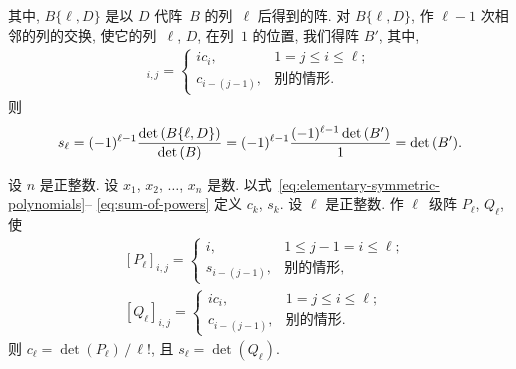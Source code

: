 \documentclass[../libro.tex]{subfiles}
\begin{document}
\begin{example}
    其中, \(B\{\ell, D\}\)
    是以 \(D\) 代阵~\(B\) 的列~\(\ell\) 后得到的阵.
    对 \(B\{\ell, D\}\),
    作 \(\ell-1\) 次相邻的列的交换,
    使它的列~\(\ell\), \(D\), 在列~\(1\) 的位置,
    我们得阵 \(B'\),
    其中,
    \begin{align*}
        [B']_{i,j} =
        \begin{cases}
            i c_i,       & 1 = j \leq i \leq \ell; \\
            c_{i-(j-1)}, & \text{别的情形}.
        \end{cases}
    \end{align*}
    则
    \begin{equation*}
        s_\ell
        = (-1)^{\ell-1}
        \frac{\det {(B\{\ell, D\})}}{\det {(B)}}
        = (-1)^{\ell-1}
        \frac{(-1)^{\ell-1} \det {(B')}}{1}
        = \det {(B')}.
        \qedhere
    \end{equation*}
\end{example}

\begin{theorem}
    设 \(n\) 是正整数.
    设 \(x_1\), \(x_2\), \(\dots\), \(x_n\) 是数.
    以式~\eqref{eq:elementary-symmetric-polynomials}--%
    \eqref{eq:sum-of-powers}
    定义 \(c_k\), \(s_k\).
    设 \(\ell\) 是正整数.
    作 \(\ell\)~级阵 \(P_\ell\), \(Q_\ell\),
    使
    \begin{align*}
        &
        [P_\ell]_{i,j} =
        \begin{cases}
            i,           & 1 \leq j-1 = i \leq \ell; \\
            s_{i-(j-1)}, & \text{别的情形},
        \end{cases}
        \\
        &
        [Q_\ell]_{i,j} =
        \begin{cases}
            i c_i,       & 1 = j \leq i \leq \ell; \\
            c_{i-(j-1)}, & \text{别的情形}.
        \end{cases}
    \end{align*}
    则 \(c_\ell = \det {(P_\ell)}\, /\, \ell!\),
    且 \(s_\ell = \det {(Q_\ell)}\).
\end{theorem}
\end{document}
